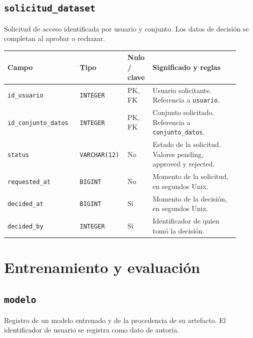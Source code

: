 \subsection*{\texttt{solicitud\_\allowbreak{}dataset}}

Solicitud de acceso identificada por usuario y conjunto. Los datos de decisión se completan al aprobar o rechazar.

\noindent
\begin{tabular}{@{}p{0.30\linewidth}p{0.16\linewidth}p{0.10\linewidth}p{0.36\linewidth}@{}}
\hline
\textbf{Campo} & \textbf{Tipo} & \textbf{Nulo / clave} & \textbf{Significado y reglas} \\
\hline
\texttt{id\_\allowbreak{}usuario} & \texttt{INTEGER} & PK, FK & Usuario solicitante. Referencia a \texttt{usuario}. \\
\texttt{id\_\allowbreak{}conjunto\_\allowbreak{}datos} & \texttt{INTEGER} & PK, FK & Conjunto solicitado. Referencia a \texttt{conjunto\_\allowbreak{}datos}. \\
\texttt{status} & \texttt{VARCHAR(12)} & No & Estado de la solicitud. Valores pending, approved y rejected. \\
\texttt{requested\_\allowbreak{}at} & \texttt{BIGINT} & No & Momento de la solicitud, en segundos Unix. \\
\texttt{decided\_\allowbreak{}at} & \texttt{BIGINT} & Sí & Momento de la decisión, en segundos Unix. \\
\texttt{decided\_\allowbreak{}by} & \texttt{INTEGER} & Sí & Identificador de quien tomó la decisión. \\
\hline
\end{tabular}

\section*{Entrenamiento y evaluación}

\subsection*{\texttt{modelo}}

Registro de un modelo entrenado y de la procedencia de su artefacto. El identificador de usuario se registra como dato de autoría.

